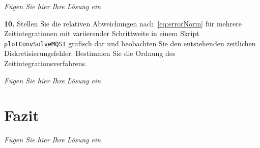 \documentclass[Protokollheft.tex]{subfiles}
\begin{document}
\emph{Fügen Sie hier Ihre Lösung ein}

  \begin{framed}
	\noindent \textbf{10.} Stellen Sie die relativen Abweichungen nach~\eqref{eq:errorNorm} für mehrere Zeitintegrationen mit
      variierender Schrittweite in einem Skript \lstinline{plotConvSolveMQST} grafisch dar und beobachten Sie den entstehenden zeitlichen Diskretisierungsfehler. Bestimmen Sie die Ordnung des Zeitintegrationsverfahrens.\label{exer:relDiffMQSFvsMQST}
\end{framed}

\emph{Fügen Sie hier Ihre Lösung ein}



\section{Fazit}
\emph{Fügen Sie hier Ihre Lösung ein}
\end{document}
